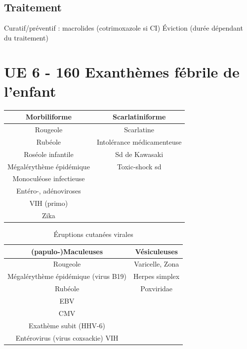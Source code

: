 \documentclass{article}
\begin{document}
\subsection{Traitement}

Curatif/préventif : macrolides (cotrimoxazole si CI) Éviction (durée
dépendant du traitement) 

\section{UE 6 - 160 Exanthèmes fébrile de l'enfant}

\begin{table}[htpb]
  \centering
  \begin{tabular}{cc}
    \toprule
    Morbiliforme & Scarlatiniforme\\
    \midrule
    Rougeole & Scarlatine\\
    Rubéole & Intolérance médicamenteuse\\
    Roséole infantile & Sd de Kawasaki\\
    Mégalérythème épidémique & Toxic-shock sd\\
    Monoculéose infectieuse & \\
    Entéro-, adénoviroses & \\
    VIH (primo) & \\
    Zika  & \\
    \bottomrule
  \end{tabular}
\end{table}

\begin{table}[htpb]
  \centering
  \caption{Éruptions cutanées virales}
  \begin{tabular}{cc}

    \toprule
    (papulo-)Maculeuses & Vésiculeuses\\
    \midrule
    Rougeole & Varicelle, Zona\\
    Mégalérythème épidémique (virus B19) & Herpes simplex\\
    Rubéole & Poxviridae \\
    EBV &\\
    CMV &\\
    Exathème subit (HHV-6) & \\
    Entérovirus (virus coxsackie) VIH & \\
    \bottomrule

  \end{tabular}
\end{table}
\end{document}
